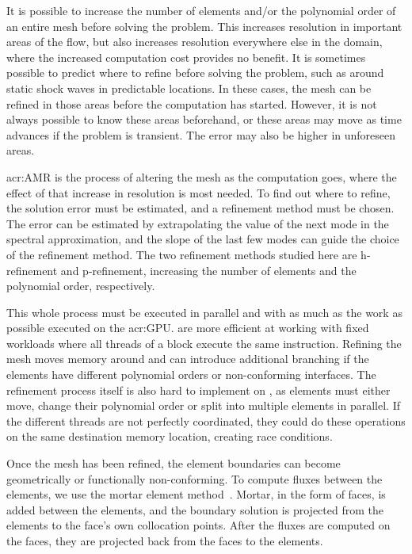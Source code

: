 It is possible to increase the number of elements and/or the polynomial order of an entire mesh
before solving the problem. This increases resolution in important areas of the flow, but also
increases resolution everywhere else in the domain, where the increased computation cost provides no
benefit. It is sometimes possible to predict where to refine before solving the problem, such as
around static shock waves in predictable locations. In these cases, the mesh can be refined in those
areas before the computation has started. However, it is not always possible to know these areas
beforehand, or these areas may move as time advances if the problem is transient. The error may also
be higher in unforeseen areas.

\Acrlong{acr:AMR} is the process of altering the mesh as the computation goes, where the effect of
that increase in resolution is most needed. To find out where to refine, the solution error must be
estimated, and a refinement method must be chosen. The error can be estimated by extrapolating the
value of the next mode in the spectral approximation, and the slope of the last few modes can guide
the choice of the refinement method. The two refinement methods studied here are h-refinement and
p-refinement, increasing the number of elements and the polynomial order, respectively.

This whole process must be executed in parallel and with as much as the work as possible executed on
the \acrshort{acr:GPU}.  are more efficient at working with fixed workloads
where all threads of a block execute the same instruction. Refining the mesh moves memory around and
can introduce additional branching if the elements have different polynomial orders or
non-conforming interfaces. The refinement process itself is also hard to implement on
, as elements must either move, change their polynomial order or split into
multiple elements in parallel. If the different threads are not perfectly coordinated, they could do
these operations on the same destination memory location, creating race conditions.

Once the mesh has been refined, the element boundaries can become geometrically or functionally
non-conforming. To compute fluxes between the elements, we use the mortar element
method~\cite{Maday1989}. Mortar, in the form of faces, is added between the elements, and the
boundary solution is projected from the elements to the face's own collocation points. After the
fluxes are computed on the faces, they are projected back from the faces to the elements. 

